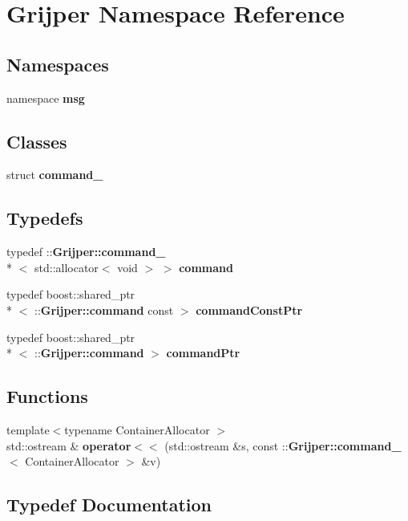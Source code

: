 \section{Grijper Namespace Reference}
\label{namespaceGrijper}
\subsection*{Namespaces}
\begin{DoxyCompactItemize}
\item 
namespace {\bf msg}
\end{DoxyCompactItemize}
\subsection*{Classes}
\begin{DoxyCompactItemize}
\item 
struct {\bf command\-\_\-}
\end{DoxyCompactItemize}
\subsection*{Typedefs}
\begin{DoxyCompactItemize}
\item 
typedef \-::{\bf Grijper\-::command\-\_\-}\\*
$<$ std\-::allocator$<$ void $>$ $>$ {\bf command}
\item 
typedef boost\-::shared\-\_\-ptr\\*
$<$ \-::{\bf Grijper\-::command} const  $>$ {\bf command\-Const\-Ptr}
\item 
typedef boost\-::shared\-\_\-ptr\\*
$<$ \-::{\bf Grijper\-::command} $>$ {\bf command\-Ptr}
\end{DoxyCompactItemize}
\subsection*{Functions}
\begin{DoxyCompactItemize}
\item 
{\footnotesize template$<$typename Container\-Allocator $>$ }\\std\-::ostream \& {\bf operator$<$$<$} (std\-::ostream \&s, const \-::{\bf Grijper\-::command\-\_\-}$<$ Container\-Allocator $>$ \&v)
\end{DoxyCompactItemize}


\subsection{Typedef Documentation}
